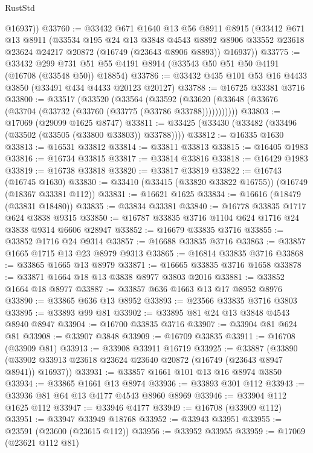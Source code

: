 \begin{lexlean}{RustStd}
\begin{coremodule}
        @16937))
@33760 := @33432
    @671
    @1640
    @13
    @56
    @8911
    @8915
    (@33412
      @671
      @13
      @8911
      (@33534
        @195
        @24
        @13
        @3848
        @4543
        @8892
        @8906
        @33552
        @23618
        @23624
        @24217
        @20872
        (@16749 (@23643 @8906 @8893))
        @16937))
@33775 := @33432
    @299
    @731
    @51
    @55
    @4191
    @8914
    (@33543 @50 @51 @50 @4191 (@16708 (@33548 @50)) @18854)
@33786 := @33432 @435 @101 @53 @16 @4433 @3850 (@33491 @434 @4433 @20123 @20127)
@33788 := @16725 @33381 @3716
@33800 := @33517
    (@33520
      (@33564
        (@33592 (@33620 (@33648 (@33676 (@33704 (@33732 (@33760 (@33775 (@33786 @33788)))))))))))
@33803 := @17069 (@29099 @1625 @8747)
@33811 := @33425 (@33430 (@33482 (@33496 (@33502 (@33505 (@33800 @33803)) @33788))))
@33812 := @16335 @1630
@33813 := @16531 @33812
@33814 := @33811 @33813
@33815 := @16405 @1983
@33816 := @16734 @33815
@33817 := @33814 @33816
@33818 := @16429 @1983
@33819 := @16738 @33818
@33820 := @33817 @33819
@33822 := @16743 (@16745 @1630)
@33830 := @33410 (@33415 (@33820 @33822 @16755)) (@16749 (@18367 @33381 @112))
@33831 := @16621 @1625
@33834 := @16616 (@18479 (@33831 @18480))
@33835 := @33834 @33381
@33840 := @16778 @33835 @1717 @624 @3838 @9315
@33850 := @16787 @33835 @3716 @1104 @624 @1716 @24 @3838 @9314 @6606 @28947
@33852 := @16679 @33835 @3716
@33855 := @33852 @1716 @24 @9314
@33857 := @16688 @33835 @3716
@33863 := @33857 @1665 @1715 @13 @23 @8979 @9313
@33865 := @16814 @33835 @3716
@33868 := @33865 @1665 @13 @8979
@33871 := @16665 @33835 @3716 @1658
@33878 := @33871 @1664 @18 @13 @3838 @8977 @3803 @2016
@33881 := @33852 @1664 @18 @8977
@33887 := @33857 @636 @1663 @13 @17 @8952 @8976
@33890 := @33865 @636 @13 @8952
@33893 := @23566 @33835 @3716 @3803
@33895 := @33893 @99 @81
@33902 := @33895 @81 @24 @13 @3848 @4543 @8940 @8947
@33904 := @16700 @33835 @3716
@33907 := @33904 @81 @624 @81
@33908 := @33907 @3848
@33909 := @16709 @33835
@33911 := @16708 (@33909 @81)
@33913 := @33908 @33911 @16719
@33925 := @33887
    (@33890 (@33902 @33913 @23618 @23624 @23640 @20872 (@16749 (@23643 @8947 @8941)) @16937))
@33931 := @33857 @1661 @101 @13 @16 @8974 @3850
@33934 := @33865 @1661 @13 @8974
@33936 := @33893 @301 @112
@33943 := @33936 @81 @64 @13 @4177 @4543 @8960 @8969
@33946 := @33904 @112 @1625 @112
@33947 := @33946 @4177
@33949 := @16708 (@33909 @112)
@33951 := @33947 @33949 @18768
@33952 := @33943 @33951
@33955 := @23591 (@23600 (@23615 @112))
@33956 := @33952 @33955
@33959 := @17069 (@23621 @112 @81)

\end{coremodule}
\end{lexlean}
